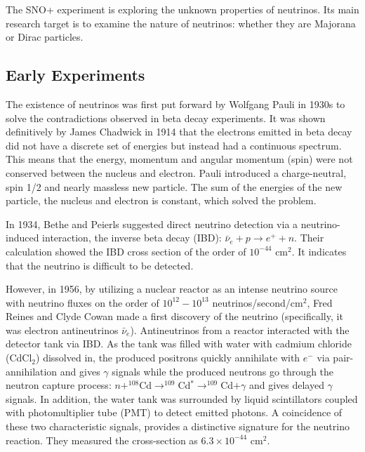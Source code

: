\documentclass[preprint,12pt]{elsarticle}
\numberwithin{equation}{section}
\begin{document}
The SNO+ experiment is exploring the unknown properties of neutrinos. Its main research target is to examine the nature of neutrinos: whether they are Majorana or Dirac particles.

\subsection{Early Experiments}
The existence of neutrinos was first put forward by Wolfgang Pauli in 1930s to solve the contradictions observed in beta decay experiments. It was shown definitively by James Chadwick in 1914 that the electrons emitted in beta decay did not have a discrete set of energies but instead had a continuous spectrum\cite{cowanexpintro}. This means that the energy, momentum and angular momentum (spin) were not conserved between the nucleus and electron. Pauli introduced a charge-neutral, spin 1/2 and nearly massless new particle. The sum of the energies of the new particle, the nucleus and electron is constant, which solved the problem. 

In 1934, Bethe and Peierls suggested direct neutrino detection via a neutrino-induced interaction, the inverse beta decay (IBD): $\bar{\nu}_e+p\to e^+ + n$. Their calculation showed the IBD cross section of the order of $10^{-44}$ cm$^2$. It indicates that the neutrino is difficult to be detected\cite{bethe1}.
 
However, in 1956, by utilizing a nuclear reactor as an intense neutrino source with neutrino fluxes on the order of $10^{12}-10^{13}$ neutrinos/second/cm$^2$, Fred Reines and Clyde Cowan made a first discovery of the neutrino (specifically, it was electron antineutrinos $\bar{\nu}_e$). Antineutrinos from a reactor interacted with the detector tank via IBD. As the tank was filled with water with cadmium chloride (CdCl$_2$) dissolved in, the produced positrons quickly annihilate with $e^-$ via pair-annihilation and gives $\gamma$ signals while the produced neutrons go through the neutron capture process: \noindent$n+^{108}$Cd$\to ^{109}$Cd$^*\to ^{109}$Cd$ +\gamma$ and gives delayed $\gamma$ signals. In addition, the water tank was surrounded by liquid scintillators coupled with photomultiplier tube (PMT) to detect emitted photons. A coincidence of these two characteristic signals, provides a distinctive signature for the neutrino reaction. They measured the cross-section as $6.3\times10^{-44}$ cm$^2$.
\end{document}
